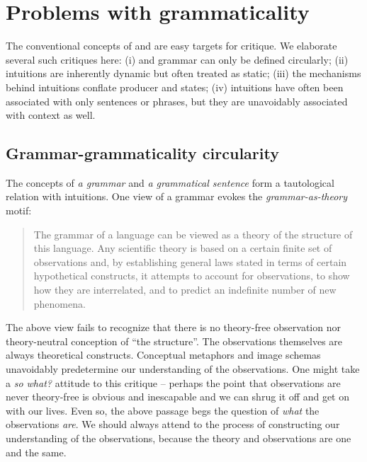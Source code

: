 \section{Problems with grammaticality}

The conventional concepts of  and  are easy targets for critique. We elaborate several such critiques here: (i)  and grammar can only be defined circularly; (ii) intuitions are inherently dynamic but often treated as static; (iii) the mechanisms behind  intuitions conflate producer and  states; (iv) intuitions have often been associated with only sentences or phrases, but they are unavoidably associated with context as well.

\subsection{Grammar-grammaticality circularity}

The concepts of \textit{a grammar} and \textit{a grammatical sentence} form a tautological relation with  intuitions. One view of a grammar evokes the \textit{grammar-as-theory} motif:

\begin{quote}
The grammar of a language can be viewed as a theory of the structure of this language. Any scientific theory is based on a certain finite set of observations and, by establishing general laws stated in terms of certain hypothetical constructs, it attempts to account for observations, to show how they are interrelated, and to predict an indefinite number of new phenomena. \citep[113]{Chomsky1956}
\end{quote}

  The above view fails to recognize that there is no theory-free observation nor theory-neutral conception of “the structure”. The observations themselves are always theoretical constructs. Conceptual metaphors and image schemas unavoidably predetermine our understanding of the observations. One might take a \textit{so what?} attitude to this critique -- perhaps the point that observations are never theory-free is obvious and inescapable and we can shrug it off and get on with our lives. Even so, the above passage begs the question of \textit{what} the observations \textit{are}. We should always attend to the process of constructing our understanding of the observations, because the theory and observations are one and the same.

